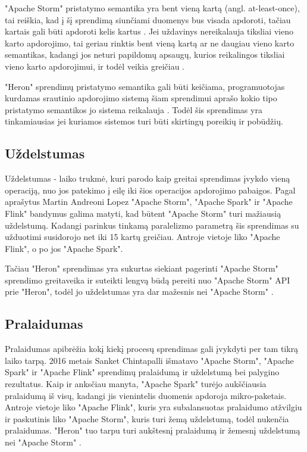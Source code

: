 \documentclass{VUMIFPSbakalaurinis}
\begin{document}
"Apache Storm" pristatymo semantika yra bent vieną kartą (angl. at-least-once), tai reiškia, kad į šį sprendimą siunčiami duomenys bus visada apdoroti, tačiau kartais gali būti apdoroti kelis kartus \cite{prithi20}. Jei uždavinys nereikalauja tiksliai vieno karto apdorojimo, tai geriau rinktis bent vieną kartą ar ne daugiau vieno karto semantikas, kadangi jos neturi papildomų apsaugų, kurios reikalingos tiksliai vieno karto apdorojimui, ir todėl veikia greičiau \cite{zhang20}. \par

"Heron" sprendimų pristatymo semantika gali būti keičiama, programuotojas kurdamas srautinio apdorojimo sistemą šiam sprendimui aprašo kokio tipo pristatymo semantikos jo sistema reikalauja \cite{delivery-semantics}. Todėl šis sprendimas yra tinkamiausias jei kuriamos sistemos turi būti skirtingų poreikių ir pobūdžių.   

\subsection{Uždelstumas}

Uždelstumas - laiko trukmė, kuri parodo kaip greitai sprendimas įvykdo vieną operaciją, nuo jos patekimo į eilę iki šios operacijos apdorojimo pabaigos. Pagal \cite{Lopez2016APC} aprašytus Martin Andreoni Lopez "Apache Storm", "Apache Spark" ir "Apache Flink" bandymus galima matyti, kad būtent "Apache Storm" turi mažiausią uždelstumą. Kadangi parinkus tinkamą paralelizmo parametrą šis sprendimas su užduotimi susidorojo net iki 15 kartų greičiau. Antroje vietoje liko "Apache Flink", o po jos "Apache Spark". \par

Tačiau "Heron" sprendimas yra sukurtas siekiant pagerinti "Apache Storm" sprendimo greitaveika ir suteikti lengvą būdą pereiti nuo "Apache Storm" API prie "Heron", todėl jo uždelstumas yra dar mažesnis nei "Apache Storm" \cite{Kulkarni:2015:THS:2723372.2742788}.

\subsection{Pralaidumas}

Pralaidumas apibrėžia kokį kiekį procesų sprendimas gali įvykdyti per tam tikrą laiko tarpą. 2016 metais Sanket Chintapalli \cite{chintapalli2016benchmarking} išmatavo "Apache Storm", "Apache Spark" ir "Apache Flink" sprendimų pralaidumą ir uždelstumą bei palygino rezultatus. Kaip ir anksčiau manyta, "Apache Spark" turėjo aukščiausia pralaidumą iš visų, kadangi jis vienintelis duomenis apdoroja mikro-paketais. Antroje vietoje liko "Apache Flink", kuris yra subalansuotas pralaidumo atžvilgiu ir paskutinis liko "Apache Storm", kuris turi žemą uždelstumą, todėl nukenčia pralaidumas. "Heron" tuo tarpu turi aukštesnį pralaidumą ir žemesnį uždelstumą nei "Apache Storm" \cite{TwitterHeron}. 
\end{document}
